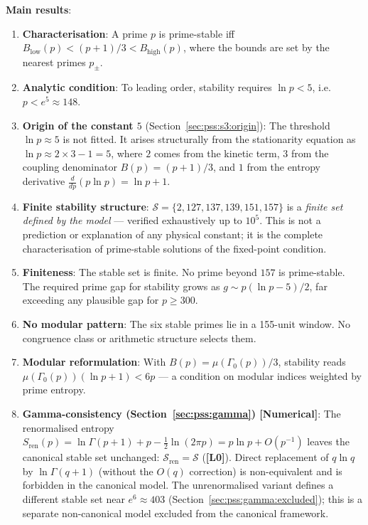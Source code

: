 \documentclass[12pt,a4paper]{article}
\theoremstyle{definition}
\theoremstyle{remark}
\newcommand{\Lzero}{\textbf{[L0]}}
\begin{document}
\begin{resultbox}
\textbf{Main results}:
\begin{enumerate}
  \item \textbf{Characterisation}: A prime $p$ is prime-stable iff
        $B_{\mathrm{low}}(p) < (p+1)/3 < B_{\mathrm{high}}(p)$, where
        the bounds are set by the nearest primes $p_\pm$.
  \item \textbf{Analytic condition}: To leading order, stability requires
        $\ln p < 5$, i.e.\ $p < e^5 \approx 148$.
  \item \textbf{Origin of the constant $5$} (Section~\ref{sec:pss:s3:origin}):
        The threshold $\ln p \approx 5$ is not fitted.  It arises structurally
        from the stationarity equation as $\ln p \approx 2\times 3 - 1 = 5$,
        where $2$ comes from the kinetic term, $3$ from the coupling denominator
        $B(p)=(p+1)/3$, and $1$ from the entropy derivative $\tfrac{d}{dp}(p\ln p)=\ln p+1$.
  \item \textbf{Finite stability structure}: $\mathcal{S} = \{2, 127, 137, 139, 151, 157\}$
        is a \emph{finite set defined by the model} — verified exhaustively up to $10^5$.
        This is not a prediction or explanation of any physical constant;
        it is the complete characterisation of prime-stable solutions of the
        fixed-point condition.
  \item \textbf{Finiteness}: The stable set is finite.  No prime beyond $157$ is
        prime-stable.  The required prime gap for stability grows as
        $g \sim p(\ln p - 5)/2$, far exceeding any plausible gap for $p \geq 300$.
  \item \textbf{No modular pattern}: The six stable primes lie in a 155-unit window.
        No congruence class or arithmetic structure selects them.
  \item \textbf{Modular reformulation}: With $B(p)=\mu(\Gamma_0(p))/3$, stability
        reads $\mu(\Gamma_0(p))(\ln p+1) < 6p$ — a condition on modular indices
        weighted by prime entropy.
  \item \textbf{Gamma-consistency (Section~\ref{sec:pss:gamma}) \textnormal{[Numerical]}}: The
        renormalised entropy $S_{\mathrm{ren}}(p) = \ln\Gamma(p+1) + p
        - \frac{1}{2}\ln(2\pi p) = p\ln p + O(p^{-1})$ leaves the canonical
        stable set unchanged: $\mathcal{S}_{\mathrm{ren}} = \mathcal{S}$
        (\Lzero{}).  Direct replacement of $q\ln q$ by $\ln\Gamma(q+1)$
        (without the $O(q)$ correction) is non-equivalent and is forbidden
        in the canonical model.  The unrenormalised variant defines a different
        stable set near $e^6 \approx 403$ (Section~\ref{sec:pss:gamma:excluded});
        this is a separate non-canonical model excluded from the canonical
        framework.
\end{enumerate}
\end{resultbox}
\end{document}
